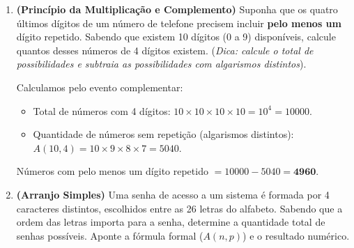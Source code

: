 \documentclass[12pt]{article}
\begin{document}
\begin{enumerate}
\item \textbf{(Princípio da Multiplicação e Complemento)} Suponha que os quatro últimos dígitos de um número de telefone precisem incluir \textbf{pelo menos um} dígito repetido. Sabendo que existem 10 dígitos (0 a 9) disponíveis, calcule quantos desses números de 4 dígitos existem. (\textit{Dica: calcule o total de possibilidades e subtraia as possibilidades com algarismos distintos}).
\vspace{0.3cm}
\begin{center}
\end{center}

\vspace{0.2cm}
\begin{tcolorbox}[colback=white, colframe=maincolor, arc=2mm, boxrule=1pt, title=\textit{Resolução:}, coltitle=white, title filled=true]
Calculamos pelo evento complementar:
\begin{itemize}
    \item Total de números com 4 dígitos: $10 \times 10 \times 10 \times 10 = 10^4 = 10000$.
    \item Quantidade de números sem repetição (algarismos distintos): $A(10,4) = 10 \times 9 \times 8 \times 7 = 5040$.
\end{itemize}
Números com pelo menos um dígito repetido $= 10000 - 5040 = \mathbf{4960}$.
\end{tcolorbox}


\item \textbf{(Arranjo Simples)} Uma senha de acesso a um sistema é formada por 4 caracteres distintos, escolhidos entre as 26 letras do alfabeto. Sabendo que a ordem das letras importa para a senha, determine a quantidade total de senhas possíveis. Aponte a fórmula formal ($A(n,p)$) e o resultado numérico.
\vspace{0.3cm}
\begin{center}
\end{center}


\end{enumerate}
\end{document}
